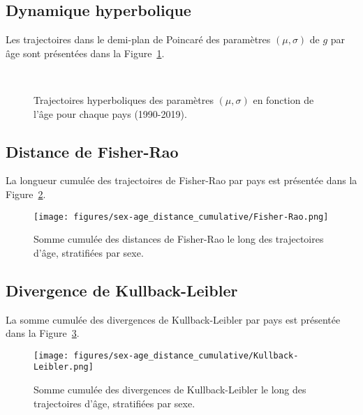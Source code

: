 \subsection{Dynamique hyperbolique}
Les trajectoires dans le demi-plan de Poincaré des paramètres \((\mu, \sigma)\) de \(g\) par âge sont présentées dans la Figure~\ref{fig:sex-age_Poincare}.
\begin{figure}[H]
	\centering
	\\
	\caption{Trajectoires hyperboliques des paramètres \((\mu, \sigma)\) en fonction de l'âge pour chaque pays (1990-2019).}
	\label{fig:sex-age_Poincare}
\end{figure}

\subsection{Distance de Fisher-Rao}
La longueur cumulée des trajectoires de Fisher-Rao par pays est présentée dans la Figure~\ref{fig:sex-age_distance_cumulative-Fisher-Rao}.
\begin{figure}[H]
	\centering
	\texttt{[image: figures/sex-age\_distance\_cumulative/Fisher-Rao.png]}
	\caption{Somme cumulée des distances de Fisher-Rao le long des trajectoires d'âge, stratifiées par sexe.}
	\label{fig:sex-age_distance_cumulative-Fisher-Rao}
\end{figure}

\subsection{Divergence de Kullback-Leibler}
La somme cumulée des divergences de Kullback-Leibler par pays est présentée dans la Figure~\ref{fig:sex-age_distance_cumulative-Kullback-Leibler}.
\begin{figure}[H]
	\centering
	\texttt{[image: figures/sex-age\_distance\_cumulative/Kullback-Leibler.png]}
	\caption{Somme cumulée des divergences de Kullback-Leibler le long des trajectoires d'âge, stratifiées par sexe.}
	\label{fig:sex-age_distance_cumulative-Kullback-Leibler}
\end{figure}

